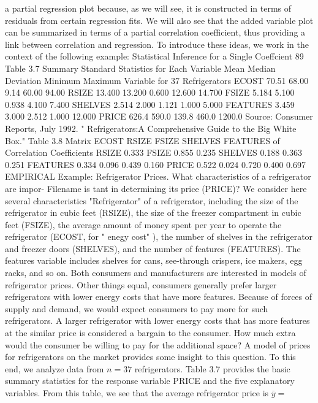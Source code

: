 \documentclass[11pt]{article}
\begin{document}
a partial regression plot because, as we will see, it is constructed in terms of
residuals from certain regression fits. We will also see that the added variable plot
can be summarized in terms of a partial correlation coefficient, thus providing a
 link between correlation and regression. To introduce these ideas, we work in the
context of the following example:
 Statistical Inference for a Single Coeffcient 89
Table 3.7 Summary
Standard Statistics for Each
Variable Mean Median Deviation Minimum Maximum Variable for 37
Refrigerators
ECOST 70.51 68.00 9.14 60.00 94.00
RSIZE 13.400 13.200 0.600 12.600 14.700
FSIZE 5.184 5.100 0.938 4.100 7.400
 SHELVES 2.514 2.000 1.121 1.000 5.000
FEATURES 3.459 3.000 2.512 1.000 12.000
PRICE 626.4 590.0 139.8 460.0 1200.0
Source: Consumer Reports, July 1992. " Refrigerators:A Comprehensive Guide to the Big
White Box."
Table 3.8 Matrix
ECOST RSIZE FSIZE SHELVES FEATURES of Correlation
Coefficients
RSIZE 0.333
FSIZE 0.855 0.235
SHELVES 0.188 0.363 0.251
FEATURES 0.334 0.096 \(0 . 4 3 9\) 0.160
PRICE 0.522 0.024 0.720 0.400 0.697
 EMPIRICAL
Example: Refrigerator Prices. What characteristics of a refrigerator are impor- Filename is
tant in determining its price (PRICE)? We consider here several characteristics "Refrigerator"
of a refrigerator, including the size of the refrigerator in cubic feet (RSIZE), the
size of the freezer compartment in cubic feet (FSIZE), the average amount of
money spent per year to operate the refrigerator (ECOST, for " enegy cost" ),
the number of shelves in the refrigerator and freezer doors (SHELVES), and
 the number of features (FEATURES). The features variable includes shelves for
cans, see-through crispers, ice makers, egg racks, and so on.
Both consumers and manufacturers are interested in models of refrigerator
prices. Other things equal, consumers generally prefer larger refrigerators with
lower energy costs that have more features. Because of forces of supply and
 demand, we would expect consumers to pay more for such refrigerators. A larger
refrigerator with lower energy costs that has more features at the similar price is
considered a bargain to the consumer. How much extra would the consumer be
willing to pay for the additional space? A model of prices for refrigerators on the
market provides some insight to this question.
 To this end, we analyze data from \(n=3 7\) refrigerators. Table 3.7 provides the
 basic summary statistics for the response variable PRICE and the five explanatory
variables. From this table, we see that the average refrigerator price is \(\overline{{y}}=\)
\end{document}
